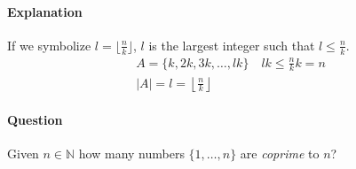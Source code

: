 \documentclass[00_complete]{subfiles}
\begin{document}
\paragraph{Explanation}

If we symbolize $l=\lfloor\frac{n}{k}\rfloor$, $l$ is the largest integer such
that $l \leq \frac{n}{k}$.
$$
\begin{gathered}
    A=\{k,2k,3k,\dots,lk\} \quad lk \leq \frac{n}{k}k=n \\
    |A|=l=\left\lfloor\frac{n}{k}\right\rfloor
\end{gathered}
$$

\paragraph{Question}

Given $n \in \mathbb{N}$ how many numbers $\{1,\dots,n\}$ are \emph{coprime} to
$n$?
\end{document}
